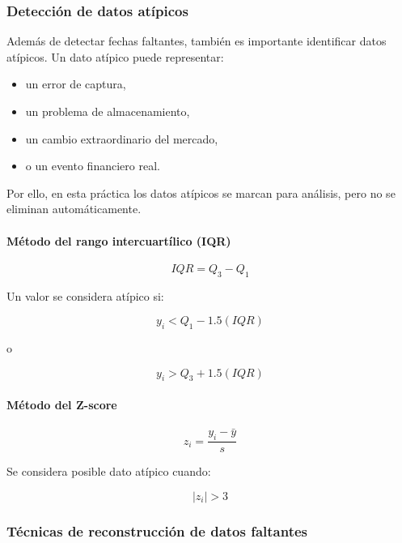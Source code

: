 \subsubsection{Detección de datos atípicos}

Además de detectar fechas faltantes, también es importante identificar datos atípicos. Un dato atípico puede representar:

\begin{itemize}
\item un error de captura,
\item un problema de almacenamiento,
\item un cambio extraordinario del mercado,
\item o un evento financiero real.
\end{itemize}

Por ello, en esta práctica los datos atípicos se marcan para análisis, pero no se eliminan automáticamente.

\paragraph{Método del rango intercuartílico (IQR)}

\[
IQR = Q_3 - Q_1
\]

Un valor se considera atípico si:

\[
y_i < Q_1 - 1.5(IQR)
\]

o

\[
y_i > Q_3 + 1.5(IQR)
\]

\paragraph{Método del Z-score}

\[
z_i = \frac{y_i-\bar y}{s}
\]

Se considera posible dato atípico cuando:

\[
|z_i| > 3
\]

\subsubsection{Técnicas de reconstrucción de datos faltantes}

